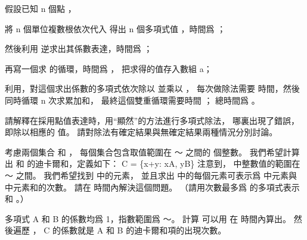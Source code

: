 \startANSWER
假設已知 n 個點 ，
\startigBase[n]
\item 將 n 個單位複數根依次代入  得出 n 個多項式值 ，時間爲 ；
\item 然後利用  逆求出其係數表達，時間爲 ；
\item 再寫一個求  的循環，時間爲 ，
把求得的值存入數組 a；
\item 利用，對這個求出係數的多項式依次除以  並乘以 ，
每次做除法需要  時間，然後同時循環 n 次求累加和，
最終這個雙重循環需要時間 ；
\stopigBase
總時間爲 。
\stopANSWER

\startEXERCISE
請解釋在採用點值表達時，用“顯然”的方法進行多項式除法，
哪裏出現了錯誤，即除以相應的  值。
請對除法有確定結果與無確定結果兩種情況分別討論。
\stopEXERCISE

\startANSWER
{}
\stopANSWER

\startEXERCISE
考慮兩個集合  和 ，
每個集合包含取值範圍在 ～ 之間的  個整數。
我們希望計算出  和  的{\EMP 迪卡爾和}，定義如下：
\startformula
C = \{x+y: x\in A, y\in B\}
\stopformula
注意到，  中整數值的範圍在 ～ 之間。
我們希望找到  中的元素，
並且求出  中的每個元素可表示爲  中元素與  中元素和的次數。
請在  時間內解決這個問題。
（\hint 請用次數最多爲  的多項式表示  和 。）
\stopEXERCISE

\startANSWER
多項式 A 和 B 的係數均爲 1，指數範圍爲 ～。
計算  可以用  在  時間內算出。
然後遍歷 ， C 的係數就是 A 和 B 的迪卡爾和項的出現次數。
\stopANSWER

\stopsection
